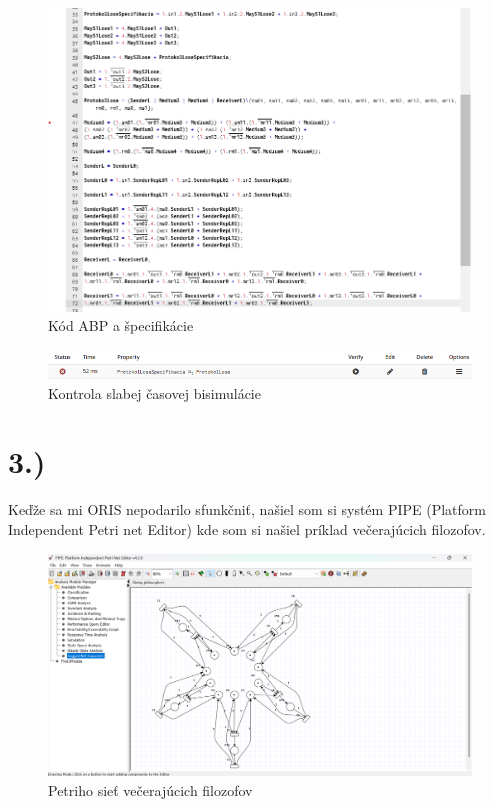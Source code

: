 \documentclass[a4paper]{article}
\begin{document}
\begin{figure}[!h]
	\centering
	\includegraphics[width=1\textwidth]{lose_code_2.png}
	\caption{Kód ABP a špecifikácie}
\end{figure}

\begin{figure}[!h]
	\centering
	\includegraphics[width=1\textwidth]{lose_test_2.png}
	\caption{Kontrola slabej časovej bisimulácie}
\end{figure}
\newpage

\section{3.)}

Keďže sa mi ORIS nepodarilo sfunkčniť, našiel som si systém PIPE (Platform Independent Petri net Editor) kde som si našiel príklad večerajúcich filozofov.

\begin{figure}[!h]
	\centering
	\includegraphics[width=1\textwidth]{dining_philo.png}
	\caption{Petriho sieť večerajúcich filozofov}
\end{figure}
\end{document}
